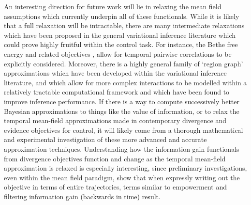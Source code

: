 An interesting direction for future work will lie in relaxing the mean field assumptions which currently underpin all of these functionals. While it is likely that a full relaxation will be intractable, there are many intermediate relaxations which have been proposed in the general variational inference literature which could prove highly fruitful within the control task. For instance, the Bethe free energy and related objectives \citep{yedidia2001generalized,pearl2014probabilistic,schwobel2018active}, allow for temporal pairwise correlations to be explicitly considered. Moreover, there is a highly general family of `region graph' approximations \citep{yedidia2005constructing,yedidia2011message} which have been developed within the variational inference literature, and which allow for more complex interactions to be modelled within a relatively tractable computational framework and which have been found to improve inference performance. If there is a way to compute successively better Bayesian approximations to things like the value of information, or to relax the temporal mean-field approximations made in contemporary divergence and evidence objectives for control, it will likely come from a thorough mathematical and experimental investigation of these more advanced and accurate approximation techniques. Understanding how the information gain functionals from divergence objectives function and change as the temporal mean-field approximation is relaxed is especially interesting, since preliminary investigations, even within the mean field paradigm, show that when expressly writing out the objective in terms of entire trajectories, terms similar to empowerment \citep{klyubin2005empowerment} and filtering information gain (backwards in time) result. 

